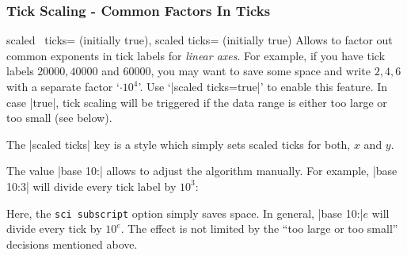 \subsubsection{Tick Scaling - Common Factors In Ticks}
\label{sec:scaled:ticks}%
\begin{pgfplotsxykeylist}{
	scaled \x\ ticks= (initially true),
	scaled ticks= (initially true)}
Allows to factor out common exponents in tick labels for \emph{linear axes}. For example, if you have tick labels $20000,40000$ and $60000$, you may want to save some space and write $2,4,6$ with a separate factor `$\cdot 10^4$'. Use `|scaled ticks=true|' to enable this feature. In case |true|, tick scaling will be triggered if the data range is either too large or too small (see below).
\begin{codeexample}[]
%
\end{codeexample}

\begin{codeexample}[]
\end{codeexample}

	The |scaled ticks| key is a style which simply sets scaled ticks for both, $x$ and $y$.

	The value |base 10:| allows to adjust the algorithm manually. For example, |base 10:3| will divide every tick label by $10^3$:
\begin{codeexample}[]
\end{codeexample}
\noindent Here, the \texttt{sci subscript} option simply saves space.
In general, |base 10:|$e$ will divide every tick by $10^e$. The effect
is not limited by the ``too large or too small'' decisions mentioned
above.


\end{pgfplotsxykeylist}
